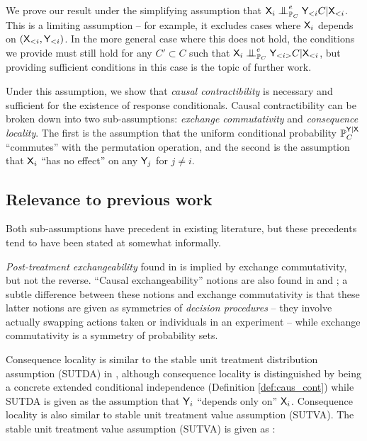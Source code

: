 We prove our result under the simplifying assumption that $\RV{X}_i\CI_{\prob{P}_C}^e \RV{Y}_{<i} C|\RV{X}_{<i}$. This is a limiting assumption -- for example, it excludes cases where $\mathsf{X}_i$ depends on $(\mathsf{X}_{<i},\mathsf{Y}_{<i})$. In the more general case where this does not hold, the conditions we provide must still hold for any $C'\subset C$ such that $\RV{X}_i\CI_{\prob{P}_C}^e \RV{Y}_{<i>} C|\RV{X}_{<i}$, but providing sufficient conditions in this case is the topic of further work.

Under this assumption, we show that \emph{causal contractibility} is necessary and sufficient for the existence of response conditionals. Causal contractibility can be broken down into two sub-assumptions: \emph{exchange commutativity} and \emph{consequence locality}. The first is the assumption that the uniform conditional probability $\mathbb{P}_C^{\mathsf{Y}|\mathsf{X}}$ ``commutes'' with the permutation operation, and the second is the assumption that $\mathsf{X}_i$ ``has no effect'' on any $\mathsf{Y}_j$ for $j\neq i$.

\subsection{Relevance to previous work}

Both sub-assumptions have precedent in existing literature, but these precedents tend to have been stated at somewhat informally.

\emph{Post-treatment exchangeability} found in \citet{dawid_decision-theoretic_2020} is implied by exchange commutativity, but not the reverse. ``Causal exchangeability'' notions are also found in \citet{greenland_identifiability_1986} and \citet{banerjee_chapter_2017}; a subtle difference between these notions and exchange commutativity is that these latter notions are given as symmetries of \emph{decision procedures} -- they involve actually swapping actions taken or individuals in an experiment -- while exchange commutativity is a symmetry of probability sets.

Consequence locality is similar to the stable unit treatment distribution assumption (SUTDA) in \citet{dawid_decision-theoretic_2020}, although consequence locality is distinguished by being a concrete extended conditional independence (Definition \ref{def:caus_cont}) while SUTDA is given as the assumption that $\mathsf{Y}_i$ ``depends only on'' $\mathsf{X}_i$.  Consequence locality is also similar to stable unit treatment value assumption (SUTVA). The stable unit treatment value assumption (SUTVA) is given as \citep{rubin_causal_2005}:

